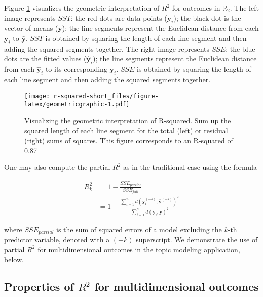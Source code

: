 Figure \ref{fig:geometricgraphic} visualizes the geometric interpretation of \(R^2\) for outcomes in \(\mathbb{R}_2\). The left image represents \(SST\): the red dots are data points (\(\boldsymbol{y}_i\)); the black dot is the vector of means (\(\bar{\boldsymbol{y}}\)); the line segments represent the Euclidean distance from each \(\boldsymbol{y}_i\) to \(\bar{\boldsymbol{y}}\). \(SST\) is obtained by squaring the length of each line segment and then adding the squared segments together. The right image represents \(SSE\): the blue dots are the fitted values (\(\hat{\boldsymbol{y}}_i\)); the line segments represent the Euclidean distance from each \(\hat{\boldsymbol{y}}_i\) to its corresponding \(\boldsymbol{y}_i\). \(SSE\) is obtained by squaring the length of each line segment and then adding the squared segments together.

\begin{figure}
\centering
\texttt{[image: r-squared-short\_files/figure-latex/geometricgraphic-1.pdf]}
\caption{\label{fig:geometricgraphic}Visualizing the geometric interpretation of R-squared. Sum up the squared length of each line segment for the total (left) or residual (right) sums of squares. This figure corresponds to an R-squared of 0.87}
\end{figure}

One may also compute the partial \(R^2\) as in the traditional case using the formula

\begin{align}
    R^2_{k} &= 1 - \frac{SSE_{partial}}{SSE_{full}}\\
        &= 1 - \frac{\sum_{i=1}^n d(\boldsymbol{y}_i^{(-k)},\bar{\boldsymbol{y}}^{(-k)})^2}{\sum_{i=1}^n d(\boldsymbol{y}_i,\bar{\boldsymbol{y}})^2}
\end{align}

where \(SSE_{partial}\) is the sum of squared errors of a model excluding the \(k\)-th predictor variable, denoted with a \((-k)\) superscript. We demonstrate the use of partial \(R^2\) for multidimensional outcomes in the topic modeling application, below.

\hypertarget{properties-of-r2-for-multidimensional-outcomes}{%
\subsection{\texorpdfstring{Properties of \(R^2\) for multidimensional outcomes}{Properties of R\^{}2 for multidimensional outcomes}}\label{properties-of-r2-for-multidimensional-outcomes}}

